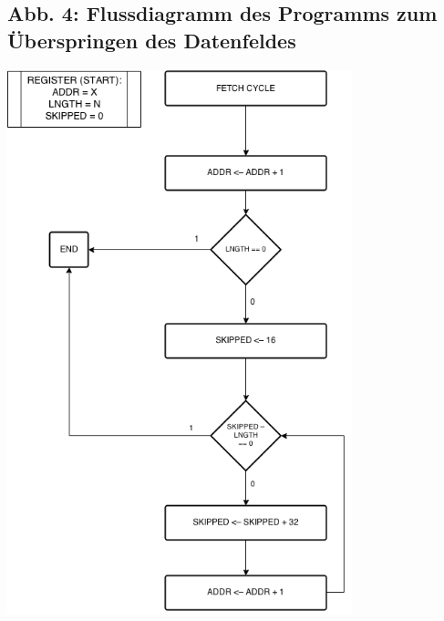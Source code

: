\documentclass[12pt,titlepage]{article}
\begin{document}
\subsection{Abb. 4: Flussdiagramm des Programms zum Überspringen des Datenfeldes}
\includegraphics[width=10cm]{skipBits.png}
\end{document}

